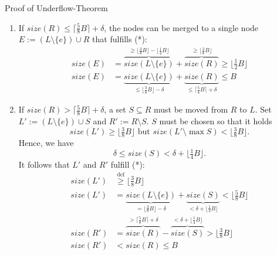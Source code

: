\documentclass[mathserif]{beamer}
\begin{document}
\begin{frame}[t]{}
\begin{columns}[t]
\begin{column}{.27\linewidth}
\begin{block}{Proof of Underflow-Theorem}
    \begin{enumerate}
    \item
    If \mbox{$size(R) \leq \lceil \frac{5}{8} B \rceil + \delta$}, the nodes
    can be merged to a single node \mbox{$E := (L \setminus \{e\}) \cup R$}
    that fulfills (*):
    \begin{align*}
    size(E)
            &= \overbrace{size(L \setminus \{e\})}^{
                            \geq \lfloor \frac{3}{8} B \rfloor 
                                    - \lfloor \frac{1}{4} B \rfloor}
                    + \overbrace{size(R)}^{
                            \geq \lfloor \frac{3}{8} B \rfloor}
            \geq \lfloor \tfrac{1}{2} B \rfloor\\
    size(E)
            &= \underbrace{size(L \setminus \{e\})}_{
                            \leq \lfloor \frac{3}{8} B \rfloor - \delta}
                    + \underbrace{size(R)}_{
                            \leq \lceil \frac{5}{8} B \rceil + \delta}
            \leq B
    \end{align*}
    \item
    If \mbox{$size(R) > \lceil \frac{5}{8} B \rceil + \delta$}, a set
    \mbox{$S \subseteq R$} must be moved from $R$ to $L$.
    Set \mbox{$L' := (L \setminus \{e\}) \cup S$} and
    \mbox{$R' := R \setminus S$}.
    $S$ must be chosen so that it holds
    \[ size(L') \geq \lfloor \tfrac{3}{8} B \rfloor \text{ but }
            size(L' \setminus \max S) < \lfloor \tfrac{3}{8} B \rfloor. \]
    Hence, we have
    \[ \delta \leq size(S) < \delta + \lfloor \tfrac{1}{4} B \rfloor. \]
    It follows that $L'$ and $R'$ fulfill (*):
    \begin{align*}
    size(L')
            &\stackrel{\mathrm{def}}{\geq} \lfloor \tfrac{3}{8} B \rfloor\\
    size(L')
            &= \underbrace{size(L \setminus \{e\})}_{
                            = \lfloor \frac{3}{8} B \rfloor - \delta}
                    + \underbrace{size(S)}_{
                            < \delta + \lfloor \frac{1}{4} B \rfloor}
            < \lfloor \tfrac{5}{8} B \rfloor\\
    size(R')
            &= \overbrace{size(R)}^{
                            > \lceil \frac{5}{8} B \rceil + \delta}
                    - \overbrace{size(S)}^{
                            < \delta + \lfloor \frac{1}{4} B \rfloor}
            > \lfloor \tfrac{3}{8} B \rfloor\\
    size(R')
            &< size(R) \leq B
    \end{align*}
    \end{enumerate}
    \end{block}

\end{column}


\end{columns}
\end{frame}
\end{document}
